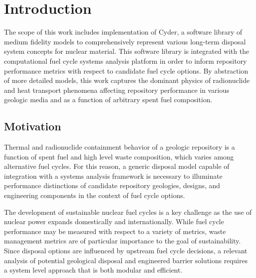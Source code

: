 \chapter{Introduction}\label{ch:introduction}


The scope of this work includes implementation of Cyder, a software library of medium 
fidelity models to comprehensively represent various long-term disposal system 
concepts for nuclear material. This software library is integrated with the 
\Cyclus computational fuel cycle systems analysis platform in order to inform repository 
performance metrics with respect to candidate fuel cycle options. By abstraction 
of more detailed models, this work captures the dominant physics of 
radionuclide and heat transport phenomena affecting repository performance in 
various geologic media and as a function of arbitrary spent fuel composition. 

\section{Motivation} 

Thermal and radionuclide containment behavior of a geologic repository is a 
function of spent fuel and high level waste composition, which varies among 
alternative fuel cycles. For this reason, a generic disposal model capable of 
integration with a systems analysis framework is necessary to illuminate 
performance distinctions of candidate repository geologies, designs, and 
engineering components in the context of fuel cycle options. 


The development of sustainable nuclear fuel cycles is a key challenge as the use 
of nuclear power expands domestically and internationally. While fuel cycle 
performance may be measured with respect to a variety of metrics, waste
management metrics are of particular importance to the goal of sustainability. 
Since disposal options are influenced by upstream fuel cycle decisions, a 
relevant analysis of potential geological disposal and engineered barrier 
solutions requires a system level approach that is both modular and efficient. 



